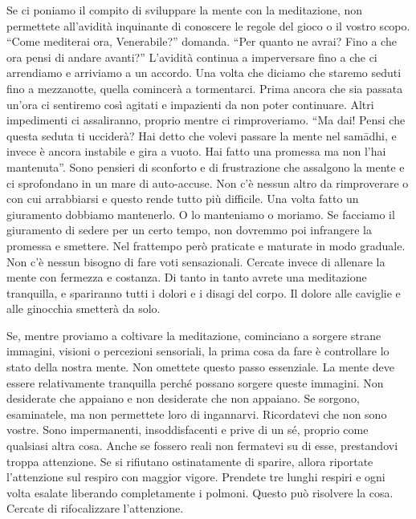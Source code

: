 Se ci poniamo il compito di sviluppare la mente con la meditazione, non
permettete all'avidità inquinante di conoscere le regole del gioco o il
vostro scopo. ``Come mediterai ora, Venerabile?'' domanda. ``Per quanto
ne avrai? Fino a che ora pensi di andare avanti?'' L'avidità continua a
imperversare fino a che ci arrendiamo e arriviamo a un accordo. Una
volta che diciamo che staremo seduti fino a mezzanotte, quella comincerà
a tormentarci. Prima ancora che sia passata un'ora ci sentiremo così
agitati e impazienti da non poter continuare. Altri impedimenti ci
assaliranno, proprio mentre ci rimproveriamo. ``Ma dai! Pensi che
questa seduta ti ucciderà? Hai detto che volevi passare la mente nel
samādhi, e invece è ancora instabile e gira a vuoto. Hai fatto una
promessa ma non l'hai mantenuta''. Sono pensieri di sconforto e di
frustrazione che assalgono la mente e ci sprofondano in un mare di
auto-accuse. Non c'è nessun altro da rimproverare o con cui arrabbiarsi
e questo rende tutto più difficile. Una volta fatto un giuramento
dobbiamo mantenerlo. O lo manteniamo o moriamo. Se facciamo il
giuramento di sedere per un certo tempo, non dovremmo poi infrangere la
promessa e smettere. Nel frattempo però praticate e maturate in modo
graduale. Non c'è nessun bisogno di fare voti sensazionali. Cercate
invece di allenare la mente con fermezza e costanza. Di tanto in tanto
avrete una meditazione tranquilla, e spariranno tutti i dolori e i
disagi del corpo. Il dolore alle caviglie e alle ginocchia smetterà da
solo.

Se, mentre proviamo a coltivare la meditazione, cominciano a sorgere
strane immagini, visioni o percezioni sensoriali, la prima cosa da fare
è controllare lo stato della nostra mente. Non omettete questo passo
essenziale. La mente deve essere relativamente tranquilla perché possano
sorgere queste immagini. Non desiderate che appaiano e non desiderate
che non appaiano. Se sorgono, esaminatele, ma non permettete loro di
ingannarvi. Ricordatevi che non sono vostre. Sono impermanenti,
insoddisfacenti e prive di un sé, proprio come qualsiasi altra cosa.
Anche se fossero reali non fermatevi su di esse, prestandovi troppa
attenzione. Se si rifiutano ostinatamente di sparire, allora riportate
l'attenzione sul respiro con maggior vigore. Prendete tre lunghi respiri
e ogni volta esalate liberando completamente i polmoni. Questo può
risolvere la cosa. Cercate di rifocalizzare l'attenzione.

